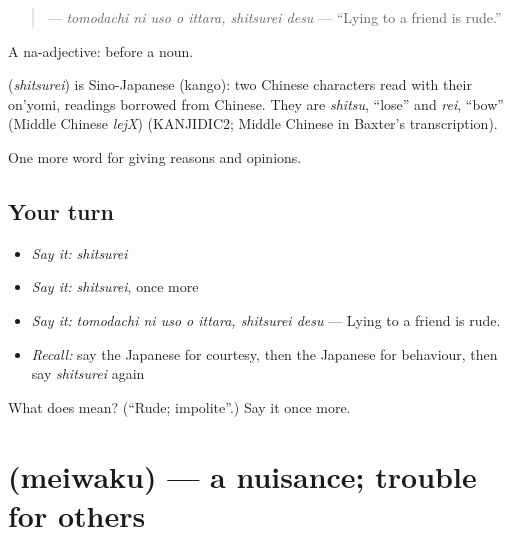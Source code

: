 \begin{quote}
\textbf{  } — \emph{tomodachi ni uso o ittara, shitsurei desu} — \textquotedblleft{}Lying to a friend is rude.\textquotedblright{}
\end{quote}

A na-adjective:  before a noun.

\begin{cousinweb}
\textbf{} (\emph{shitsurei}) is Sino-Japanese (kango): two Chinese characters read with their on'yomi, readings borrowed from Chinese. They are \emph{shitsu}, \textquotedblleft{}lose\textquotedblright{} and \emph{rei}, \textquotedblleft{}bow\textquotedblright{} (Middle Chinese \emph{lejX}) (KANJIDIC2; Middle Chinese in Baxter's transcription).
\end{cousinweb}

\begin{grammarlens}[title={What you've built}]
One more word for giving reasons and opinions.
\end{grammarlens}

\subsection*{Your turn}
\begin{itemize}
\raggedright
  \item \emph{Say it:} \emph{shitsurei}
  \item \emph{Say it:} \emph{shitsurei}, once more
  \item \emph{Say it:} \emph{tomodachi ni uso o ittara, shitsurei desu} — Lying to a friend is rude.
  \item \emph{Recall:} say the Japanese for courtesy, then the Japanese for behaviour, then say \emph{shitsurei} again
\end{itemize}

\begin{tcolorbox}[breakable,colback=teal!4,colframe=teal!35!black,title={Before you move on}]
What does  mean? (\textquotedblleft{}Rude; impolite\textquotedblright{}.) Say it once more.
\end{tcolorbox}
\section[\texorpdfstring{\ja{めいわく} (meiwaku)}{めいわく (meiwaku)}]{ (meiwaku) — a nuisance; trouble for others}

